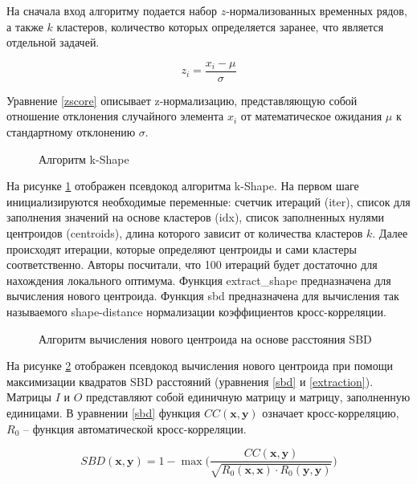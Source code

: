 На сначала вход алгоритму подается набор $z$-нормализованных временных рядов,
а также $k$ кластеров, количество которых определяется заранее,
что является отдельной задачей.

\begin{equation} \label{zscore}
    z_i = \frac{x_i-\mu}{\sigma}
\end{equation}

Уравнение \ref{zscore} описывает z-нормализацию, представляющую собой
отношение отклонения случайного элемента $x_i$
от математическое ожидания $\mu$ к стандартному отклонению $\sigma$.

\begin{figure}[H]
    \caption{Алгоритм k-Shape}
    \label{kshape}
\end{figure}

На рисунке \ref{kshape} отображен псевдокод алгоритма k-Shape.
На первом шаге инициализируются необходимые переменные:
счетчик итераций (iter), список для заполнения значений на основе кластеров (idx),
список заполненных нулями центроидов (centroids), длина которого зависит от количества кластеров $k$.
Далее происходят итерации, которые определяют центроиды и сами кластеры соответственно.
Авторы посчитали, что 100 итераций будет достаточно для нахождения локального оптимума.
Функция extract\_shape предназначена для вычисления нового центроида.
Функция sbd предназначена для вычисления так называемого shape-distance
нормализации коэффициентов кросс-корреляции.

\begin{figure}[H]
    \caption{Алгоритм вычисления нового центроида на основе расстояния SBD}
    \label{extract_shape}
\end{figure}

На рисунке \ref{extract_shape} отображен псевдокод вычисления нового центроида при помощи
максимизации квадратов SBD расстояний (уравнения \ref{sbd} и \ref{extraction}).
Матрицы $I$ и $O$ представляют собой единичную матрицу и матрицу, заполненную единицами.
В уравнении \ref{sbd} функция $CC(\textbf{x},\textbf{y})$ означает кросс-корреляцию,
$R_0$ -- функция автоматической кросс-корреляции.

\begin{equation} \label{sbd}
    SBD(\textbf{x}, \textbf{y}) = 1 - \max \Big( \frac{CC(\textbf{x},\textbf{y})}{\sqrt{R_0(\textbf{x}, \textbf{x})\cdot R_0(\textbf{y}, \textbf{y})}}\Big)
\end{equation}

